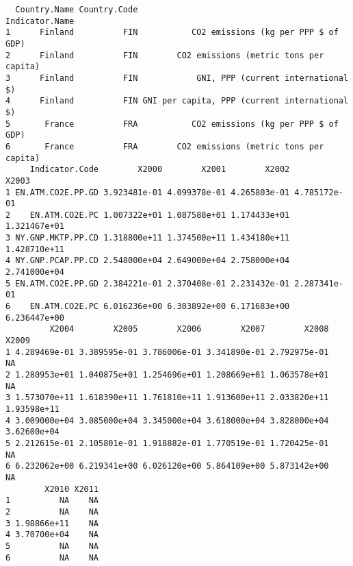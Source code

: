 \documentclass[xcolor={usenames,svgnames,dvipsnames}]{beamer}
\begin{document}
\begin{frame}[fragile]
\begin{verbatim}
  Country.Name Country.Code                                Indicator.Name
1      Finland          FIN           CO2 emissions (kg per PPP $ of GDP)
2      Finland          FIN        CO2 emissions (metric tons per capita)
3      Finland          FIN            GNI, PPP (current international $)
4      Finland          FIN GNI per capita, PPP (current international $)
5       France          FRA           CO2 emissions (kg per PPP $ of GDP)
6       France          FRA        CO2 emissions (metric tons per capita)
     Indicator.Code        X2000        X2001        X2002        X2003
1 EN.ATM.CO2E.PP.GD 3.923481e-01 4.099378e-01 4.265803e-01 4.785172e-01
2    EN.ATM.CO2E.PC 1.007322e+01 1.087588e+01 1.174433e+01 1.321467e+01
3 NY.GNP.MKTP.PP.CD 1.318800e+11 1.374500e+11 1.434180e+11 1.428710e+11
4 NY.GNP.PCAP.PP.CD 2.548000e+04 2.649000e+04 2.758000e+04 2.741000e+04
5 EN.ATM.CO2E.PP.GD 2.384221e-01 2.370408e-01 2.231432e-01 2.287341e-01
6    EN.ATM.CO2E.PC 6.016236e+00 6.303892e+00 6.171683e+00 6.236447e+00
         X2004        X2005        X2006        X2007        X2008       X2009
1 4.289469e-01 3.389595e-01 3.786006e-01 3.341890e-01 2.792975e-01          NA
2 1.280953e+01 1.040875e+01 1.254696e+01 1.208669e+01 1.063578e+01          NA
3 1.573070e+11 1.618390e+11 1.761810e+11 1.913600e+11 2.033820e+11 1.93598e+11
4 3.009000e+04 3.085000e+04 3.345000e+04 3.618000e+04 3.828000e+04 3.62600e+04
5 2.212615e-01 2.105801e-01 1.918882e-01 1.770519e-01 1.720425e-01          NA
6 6.232062e+00 6.219341e+00 6.026120e+00 5.864109e+00 5.873142e+00          NA
        X2010 X2011
1          NA    NA
2          NA    NA
3 1.98866e+11    NA
4 3.70700e+04    NA
5          NA    NA
6          NA    NA
\end{verbatim}
\end{frame}
\end{document}
